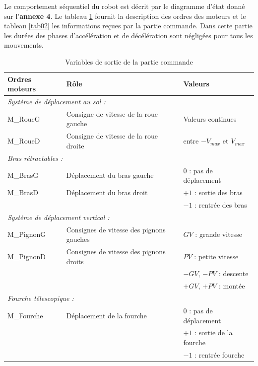 Le comportement séquentiel du robot est décrit par le diagramme d'état donné sur l'\textbf{annexe 4}. Le tableau \ref{tab01} fournit la description des ordres des moteurs et le tableau \ref{tab02} les informations reçues par la partie commande. Dans cette partie les durées des phases d'accélération et de décélération sont négligées pour tous les mouvements.


\newpage

\begin{table}[!ht]
\renewcommand{\arraystretch}{1.3}
\begin{tabular}{|p{3.3cm}|p{8cm}|p{4.5cm}|}
  \hline
  \textbf{Ordres moteurs} & \textbf{Rôle} & \textbf{Valeurs} \\
  \hline
  \multicolumn{3}{|l|}{\textit{Système de déplacement au sol :}} \\
  \hline
  M\_RoueG & Consigne de vitesse de la roue gauche & Valeurs continues \\
  M\_RoueD & Consigne de vitesse de la roue droite & entre $-V_{max}$ et $V_{max}$ \\
  \hline
  \multicolumn{3}{|l|}{\textit{Bras rétractables :}} \\
  \hline
  M\_BrasG & Déplacement du bras gauche & $0$ : pas de déplacement \\
  M\_BrasD & Déplacement du bras droit  & $+1$ : sortie des bras \\
            &                            & $-1$ : rentrée des bras \\
  \hline
  \multicolumn{3}{|l|}{\textit{Système de déplacement vertical :}} \\
  \hline
  M\_PignonG & Consignes de vitesse des pignons gauches & $GV$ : grande vitesse \\
  M\_PignonD & Consignes de vitesse des pignons droits  & $PV$ : petite vitesse \\
             &                                           & $-GV$, $-PV$ : descente \\
             &                                           & $+GV$, $+PV$ : montée \\
  \hline
  \multicolumn{3}{|l|}{\textit{Fourche télescopique :}} \\
  \hline
  M\_Fourche & Déplacement de la fourche & $0$ : pas de déplacement \\
             &                           & $+1$ : sortie de la fourche \\
             &                           & $-1$ : rentrée fourche \\
  \hline
\end{tabular}
\caption{\label{tab01}Variables de sortie de la partie commande}
\end{table}

